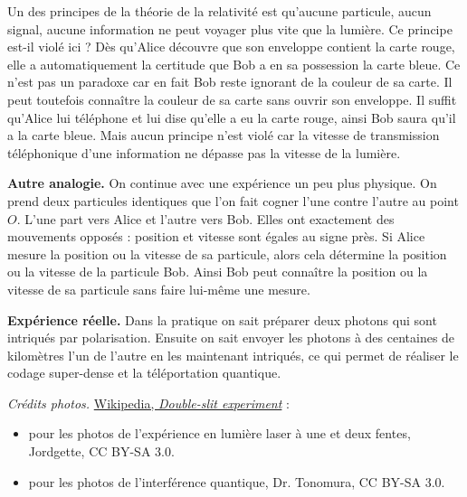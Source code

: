 \documentclass[11pt,class=report,crop=false]{standalone}
\begin{document}
 
Un des principes de la théorie de la relativité est qu'aucune particule, aucun signal, aucune information ne peut voyager plus vite que la lumière. Ce principe est-il violé ici ? Dès qu'Alice découvre que son enveloppe contient la carte rouge, elle a automatiquement la certitude que Bob a en sa possession la carte bleue. Ce n'est pas un paradoxe car en fait Bob reste ignorant de la couleur de sa carte. Il peut toutefois connaître la couleur de sa carte sans ouvrir son enveloppe. Il suffit qu'Alice lui téléphone et lui dise qu'elle a eu la carte rouge, ainsi Bob saura qu'il a la carte bleue. Mais aucun principe n'est violé car la vitesse de transmission téléphonique d'une information ne dépasse pas la vitesse de la lumière.

\bigskip 
\textbf{Autre analogie.} On continue avec une expérience un peu plus physique.
On prend deux particules identiques que l'on fait cogner l'une contre l'autre au point $O$.
L'une part vers Alice et l'autre vers Bob. Elles ont exactement des mouvements opposés : position et vitesse sont égales au signe près. Si Alice mesure la position ou la vitesse de sa particule, alors cela détermine la position ou la vitesse de la particule Bob. Ainsi Bob peut connaître la position ou la vitesse de sa particule sans faire lui-même une mesure.


\bigskip
\textbf{Expérience réelle.} Dans la pratique on sait préparer deux photons qui sont intriqués par polarisation. Ensuite on sait envoyer les photons à des centaines de kilomètres l'un de l'autre en les maintenant intriqués, ce qui permet de réaliser le codage super-dense et la téléportation quantique.

\bigskip
\bigskip

\emph{Crédits photos.} \href{https://en.wikipedia.org/wiki/Double-slit_experiment}{Wikipedia, \emph{Double-slit experiment}} :
\begin{itemize}
  \item pour les photos de l'expérience en lumière laser à une et deux fentes, Jordgette, CC BY-SA 3.0.
  \item pour les photos de l'interférence quantique, Dr. Tonomura, CC BY-SA 3.0.
\end{itemize}
\end{document}
